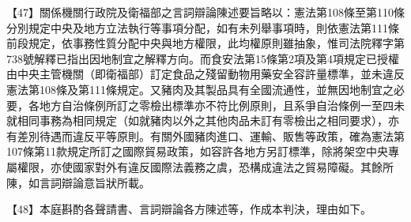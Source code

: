 \documentclass{ctexart} %
\begin{document}
{【47】關係機關行政院及衛福部之言詞辯論陳述要旨略以：憲法第108條至第110條分別規定中央及地方立法執行等事項分配，如有未列舉事項時，則依憲法第111條前段規定，依事務性質分配中央與地方權限，此均權原則雖抽象，惟司法院釋字第738號解釋已指出因地制宜之解釋方向。而食安法第15條第2項及第4項規定已授權由中央主管機關（即衛福部）訂定食品之殘留動物用藥安全容許量標準，並未違反憲法第108條及第111條規定。又豬肉及其製品具有全國流通性，並無因地制宜之必要，各地方自治條例所訂之零檢出標準亦不符比例原則，且系爭自治條例一至四未就相同事務為相同規定（如就豬肉以外之其他肉品未訂有零檢出之相同要求），亦有差別待遇而違反平等原則。有關外國豬肉進口、運輸、販售等政策，確為憲法第107條第11款規定所訂之國際貿易政策，如容許各地方另訂標準，除將架空中央專屬權限，亦使國家對外有違反國際法義務之虞，恐構成違法之貿易障礙。其餘所陳，如言詞辯論意旨狀所載。

【48】本庭斟酌各聲請書、言詞辯論各方陳述等，作成本判決，理由如下。

}
\end{document}
